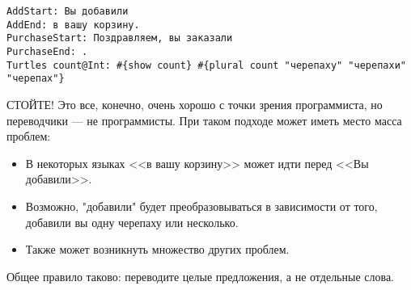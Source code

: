 \begin{lstlisting}
AddStart: Вы добавили
AddEnd: в вашу корзину.
PurchaseStart: Поздравляем, вы заказали
PurchaseEnd: .
Turtles count@Int: #{show count} #{plural count "черепаху" "черепахи" "черепах"}
\end{lstlisting}

СТОЙТЕ! Это все, конечно, очень хорошо с точки зрения программиста, но переводчики --- не программисты. При таком подходе может иметь место масса проблем:

\begin{itemize}
  \item В некоторых языках <<в вашу корзину>> может идти перед <<Вы добавили>>.
  \item Возможно, "добавили" будет преобразовываться в зависимости от того, добавили вы одну черепаху или несколько.
  \item Также может возникнуть множество других проблем. %
\end{itemize}

Общее правило таково: переводите целые предложения, а не отдельные слова.
